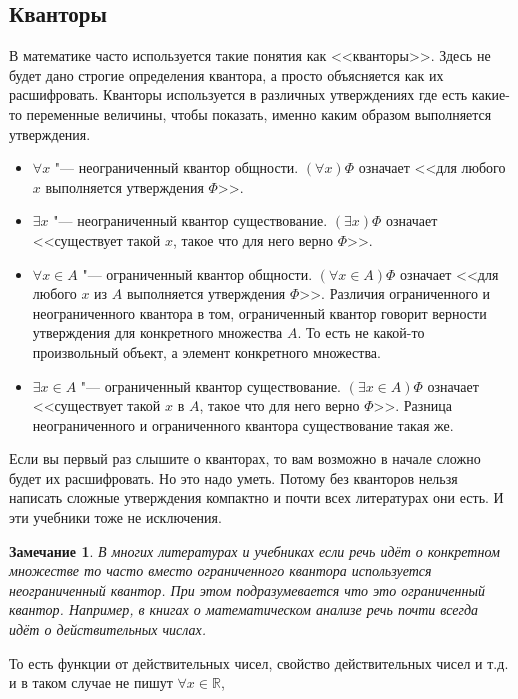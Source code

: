 \documentclass[a4paper, 16pt, oneside]{book}
\newtheorem{Note}{Замечание}[theorem]
\begin{document}
\subsection{Кванторы}
\par В математике часто используется такие понятия как <<кванторы>>. Здесь не будет дано строгие определения квантора, а просто объясняется как их расшифровать.
Кванторы используется в различных утверждениях где есть какие-то переменные величины, чтобы показать, именно каким образом выполняется утверждения.
\begin{itemize}
    \item \(\forall x\) "--- неограниченный квантор общности. \((\forall x)\Phi\) означает <<для любого \(x\) выполняется утверждения \(\Phi\)>>.
    \item \(\exists x\) "--- неограниченный квантор существование. \((\exists x)\Phi\) означает <<существует такой \(x\), такое что для него верно \(\Phi\)>>.
    \item \(\forall x \in A\) "--- ограниченный квантор общности. \((\forall x \in A)\Phi\) означает <<для любого \(x\) из \(A\) выполняется утверждения \(\Phi\)>>.
        Различия ограниченного и неограниченного квантора в том, ограниченный квантор говорит верности утверждения для конкретного множества \(A\).
        То есть не какой-то произвольный объект, а элемент конкретного множества.
    \item \(\exists x \in A\) "--- ограниченный квантор существование. \((\exists x \in A)\Phi\) означает <<существует такой \(x\) в \(A\),
        такое что для него верно \(\Phi\)>>. Разница неограниченного и ограниченного квантора существование такая же.
\end{itemize}
\par Если вы первый раз слышите о кванторах, то вам возможно в начале сложно будет их расшифровать.
Но это надо уметь. Потому без кванторов нельзя написать сложные утверждения компактно и почти всех литературах они есть.
И эти учебники тоже не исключения.
\begin{Note}
    \par В многих литературах и учебниках если речь идёт о конкретном множестве то часто вместо ограниченного квантора используется неограниченный квантор.
    При этом подразумевается что это ограниченный квантор. Например, в книгах о математическом анализе речь почти всегда идёт о действительных числах.
\end{Note}
То есть функции от действительных чисел, свойство действительных чисел и т.д. и в таком случае не пишут \(\forall x \in \mathbb{R}\),
\end{document}
